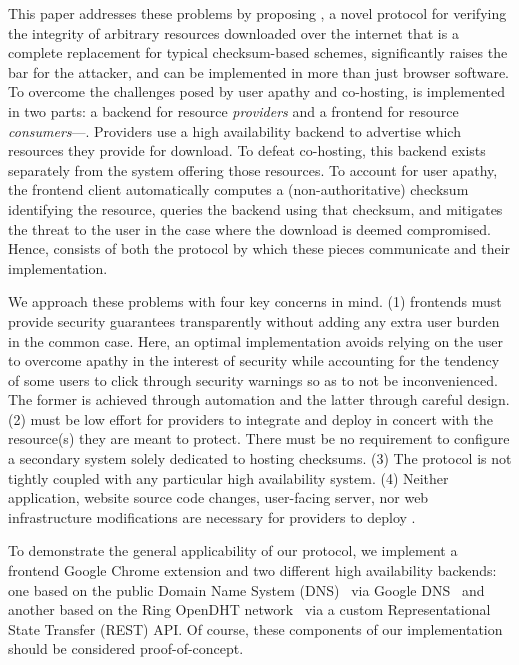 This paper addresses these problems by proposing \SYSTEM{}, a novel protocol for
verifying the integrity of arbitrary resources downloaded over the internet that
is a complete replacement for typical checksum-based schemes, significantly
raises the bar for the attacker, and can be implemented in more than just
browser software. To overcome the challenges posed by user apathy and
co-hosting, \SYSTEM{} is implemented in two parts: a backend for resource
\emph{providers} and a frontend for resource \emph{consumers}---. Providers use a high availability backend to advertise which resources
they provide for download. To defeat co-hosting, this backend exists separately
from the system offering those resources. To account for user apathy, the
frontend client automatically computes a (non-authoritative) checksum
identifying the resource, queries the backend using that checksum, and mitigates
the threat to the user in the case where the download is deemed compromised.
Hence, \SYSTEM{} consists of both the protocol by which these pieces communicate
and their implementation.

We approach these problems with four key concerns in mind. (1) \SYSTEM{}
frontends must provide security guarantees transparently without adding any
extra user burden in the common case. Here, an optimal implementation avoids
relying on the user to overcome apathy in the interest of security while
accounting for the tendency of some users to click through security warnings so
as to not be inconvenienced. The former is achieved through automation and the
latter through careful design. (2) \SYSTEM{} must be low effort for providers to
integrate and deploy in concert with the resource(s) they are meant to protect.
There must be no requirement to configure a secondary system solely dedicated to
hosting checksums. (3) The protocol is not tightly coupled with any particular
high availability system. (4) Neither application, website source code changes,
user-facing server, nor web infrastructure modifications are necessary for
providers to deploy \SYSTEM{}.

To demonstrate the general applicability of our protocol, we implement a
frontend Google Chrome extension and two different high availability backends:
one based on the public Domain Name System (DNS)~\cite{DNS1, DNS2} via Google
DNS~\cite{GoogleDNS} and another based on the Ring OpenDHT
network~\cite{OpenDHT, savoirfairelinux} via a custom Representational State
Transfer (REST) API. Of course, these \SYSTEM{} components of our implementation
should be considered proof-of-concept.

